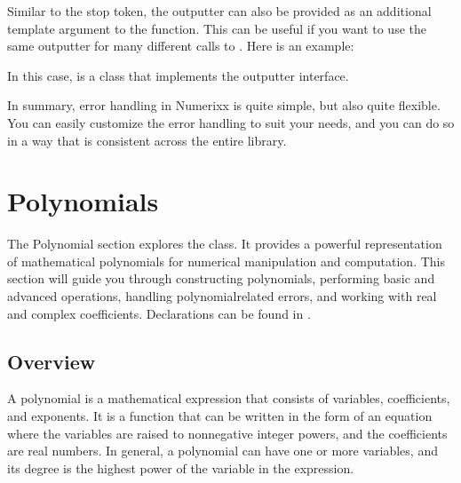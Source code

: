 \documentclass[letterpaper,10pt,english]{sphinxmanual}
\begin{document}
\sphinxAtStartPar
Similar to the stop token, the outputter can also be provided as an additional template argument to the  function. This can be useful if you want to use the same outputter for many different calls to . Here is an example:

\begin{sphinxVerbatim}[commandchars=\\\{\}]
\end{sphinxVerbatim}

\sphinxAtStartPar
In this case,  is a class that implements the outputter interface.

\sphinxAtStartPar
In summary, error handling in Numerixx is quite simple, but also quite flexible. You can easily customize the error handling to suit your needs, and you can do so in a way that is consistent across the entire library.

\sphinxstepscope


\chapter{Polynomials}
\label{\detokenize{docPolynomial:polynomials}}\label{\detokenize{docPolynomial:id1}}\label{\detokenize{docPolynomial::doc}}
\sphinxAtStartPar
The Polynomial section explores the  class. It provides a powerful representation of mathematical polynomials for numerical manipulation and computation. This section will guide you through constructing polynomials, performing basic and advanced operations, handling polynomial\sphinxhyphen{}related errors, and working with real and complex coefficients. Declarations can be found in .


\section{Overview}
\label{\detokenize{docPolynomial:overview}}
\sphinxAtStartPar
A polynomial is a mathematical expression that consists of variables, coefficients, and exponents. It is a function that can be written in the form of an equation where the variables are raised to non\sphinxhyphen{}negative integer powers, and the coefficients are real numbers. In general, a polynomial can have one or more variables, and its degree is the highest power of the variable in the expression.
\end{document}
